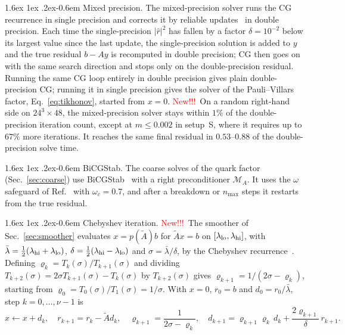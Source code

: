 \documentclass[11pt,a4paper]{article}
\makeatletter
\newcounter{alg}
\newif\ifshownew \shownewtrue
\DeclareRobustCommand\New{\ifshownew\textcolor{red}{New!!!}\ \else\ignorespaces\fi}
\renewcommand\paragraph{\@startsection{paragraph}{4}{\z@}%
  {1.6ex \@plus 1ex \@minus .2ex}{-0.6em}%
  {\normalfont\normalsize\itshape}}
\numberwithin{equation}{section}
\newcommand{\AL}{\tilde A_{L}}
\newif\ifresults
\makeatother
\begin{document}
\paragraph{Mixed precision.} The mixed-precision solver runs the CG recurrence in single precision
and corrects it by reliable updates~\cite{SleijpenvdV,ClarkMixed} in double precision. Each time
the single-precision $|\hat r|^2$ has fallen by a factor $\delta=10^{-2}$ below its largest value
since the last update, the single-precision solution is added to $y$ and the true residual $b-Ay$
is recomputed in double precision; CG then goes on with the same search direction and stops only on
the double-precision residual. Running the same CG loop entirely in double precision gives plain
double-precision CG; running it in single precision gives the solver of the Pauli--Villars factor,
Eq.~\eqref{eq:tikhonov}, started from $x=0$. \New On a random right-hand side on $24^3\times48$, the
mixed-precision solver stays within $1\%$ of the double-precision iteration count, except at
$m\le0.002$ in setup~S, where it requires up to $67\%$ more iterations. It reaches the same final
residual in $0.53$--$0.88$ of the double-precision solve time.

\paragraph{BiCGStab.} The coarse solves of the quark factor (Sec.~\ref{sec:coarse}) use
BiCGStab~\cite{vanderVorst} with a right preconditioner $\mathcal M_A$. It uses the $\omega$
safeguard of Ref.~\cite{SleijpenvdVomega} with $\omega_c=0.7$, and after a breakdown
or $n_{\max}$ steps it restarts from the true residual.\ifresults{} The same algorithm, with
$\mathcal M_A=1$ and in double precision, is the Krylov solver on $\AL$ alone of
Sec.~\ref{sec:nomg}.\fi

\paragraph{Chebyshev iteration.} \New The smoother of Sec.~\ref{sec:smoother} evaluates
$x=p(\tilde A)b$ for $\tilde Ax=b$ on $[\lambda_{\rm lo},\lambda_{\rm hi}]$, with
$\bar\lambda=\frac12(\lambda_{\rm hi}+\lambda_{\rm lo})$,
$\delta=\frac12(\lambda_{\rm hi}-\lambda_{\rm lo})$ and $\sigma=\bar\lambda/\delta$, by the
Chebyshev recurrence~\cite{Saad}. Defining $\varrho_k=T_k(\sigma)/T_{k+1}(\sigma)$ and dividing
$T_{k+2}(\sigma)=2\sigma T_{k+1}(\sigma)-T_k(\sigma)$ by $T_{k+2}(\sigma)$ gives
$\varrho_{k+1}=1/(2\sigma-\varrho_k)$, starting from $\varrho_0=T_0(\sigma)/T_1(\sigma)=1/\sigma$.
With $x=0$, $r_0=b$ and $d_0=r_0/\bar\lambda$, step $k=0,\dots,\nu-1$ is
\begin{equation}
x\leftarrow x+d_k,\quad r_{k+1}=r_k-\tilde Ad_k,\quad
\varrho_{k+1}=\frac{1}{2\sigma-\varrho_k},\quad
d_{k+1}=\varrho_{k+1}\varrho_k\,d_k+\frac{2\varrho_{k+1}}{\delta}\,r_{k+1}.
\label{eq:cheb_rec}
\end{equation}
\end{document}
